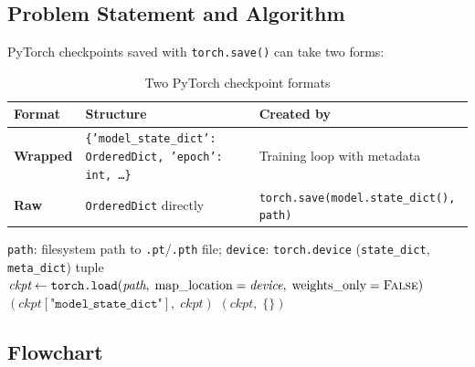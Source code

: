 \documentclass[12pt,a4paper]{article}
\theoremstyle{definition}
\theoremstyle{remark}
\begin{document}
\subsection{Problem Statement and Algorithm}

PyTorch checkpoints saved with \texttt{torch.save()} can take two forms:

\begin{table}[H]
\centering
\caption{Two PyTorch checkpoint formats}
\begin{tabularx}{\textwidth}{lXX}
\toprule
Format & Structure & Created by \\
\midrule
\textbf{Wrapped} & \texttt{\{'model\_state\_dict': OrderedDict, 'epoch': int, \ldots\}} & Training loop with metadata \\
\textbf{Raw}     & \texttt{OrderedDict} directly & \texttt{torch.save(model.state\_dict(), path)} \\
\bottomrule
\end{tabularx}
\end{table}

\begin{algorithm}[H]
\caption{\texttt{\_load\_checkpoint}(path, device)}
\label{alg:load_ckpt}
\begin{algorithmic}[1]
\Require \texttt{path}: filesystem path to \texttt{.pt}/\texttt{.pth} file;
         \texttt{device}: \texttt{torch.device}
\Ensure (\texttt{state\_dict}, \texttt{meta\_dict}) tuple
\State $\textit{ckpt} \gets \texttt{torch.load}(\textit{path},\;
       \text{map\_location}=\textit{device},\; \text{weights\_only}=\textsc{False})$
  \State \Return $(\textit{ckpt}[\texttt{"model\_state\_dict"}],\; \textit{ckpt})$
\Else
  \State \Return $(\textit{ckpt},\; \{\})$
\EndIf
\end{algorithmic}
\end{algorithm}

\subsection{Flowchart}
\end{document}
